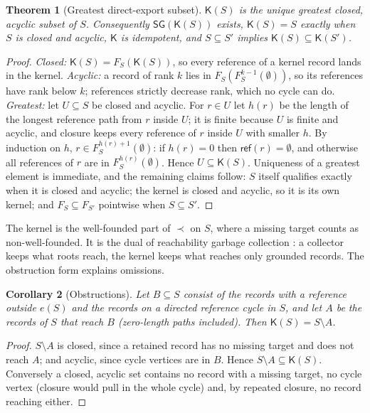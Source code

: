 \documentclass[11pt]{article}
\theoremstyle{plain}
\newtheorem{theorem}{Theorem}
\newtheorem{corollary}[theorem]{Corollary}
\theoremstyle{definition}
\theoremstyle{remark}
\newcommand{\SG}{\mathsf{SG}}
\newcommand{\refs}{\prec}
\newcommand{\Kernel}{\mathsf{K}}
\newcommand{\refset}{\mathsf{ref}}
\begin{document}
\begin{theorem}[Greatest direct-export subset]\label{thm:kernel}
$\Kernel(S)$ is the unique greatest closed, acyclic subset of $S$. Consequently
$\SG(\Kernel(S))$ exists, $\Kernel(S)=S$ exactly when $S$ is closed and acyclic,
$\Kernel$ is idempotent, and $S\subseteq S'$ implies $\Kernel(S)\subseteq\Kernel(S')$.
\end{theorem}
\begin{proof}
\emph{Closed:} $\Kernel(S)=F_S(\Kernel(S))$, so every reference of a kernel record
lands in the kernel. \emph{Acyclic:} a record of rank $k$ lies in
$F_S(F_S^{k-1}(\emptyset))$, so its references have rank below $k$; references
strictly decrease rank, which no cycle can do. \emph{Greatest:} let $U\subseteq S$
be closed and acyclic. For $r\in U$ let $h(r)$ be the length of the longest
reference path from $r$ inside $U$; it is finite because $U$ is finite and
acyclic, and closure keeps every reference of $r$ inside $U$ with smaller $h$. By
induction on $h$, $r\in F_S^{h(r)+1}(\emptyset)$: if $h(r)=0$ then
$\refset(r)=\emptyset$, and otherwise all references of $r$ are in
$F_S^{h(r)}(\emptyset)$. Hence $U\subseteq\Kernel(S)$. Uniqueness of a greatest
element is immediate, and the remaining claims follow: $S$ itself qualifies exactly
when it is closed and acyclic; the kernel is closed and acyclic, so it is its own
kernel; and $F_S\subseteq F_{S'}$ pointwise when $S\subseteq S'$.
\end{proof}

The kernel is the well-founded part of $\refs$ on $S$, where a missing target
counts as non-well-founded. It is the dual of reachability garbage collection
\cite{jones1996gc}: a collector keeps what roots reach, the kernel keeps what reaches
only grounded records. The obstruction form explains omissions.

\begin{corollary}[Obstructions]\label{cor:obstructions}
Let $B\subseteq S$ consist of the records with a reference outside $e(S)$ and the
records on a directed reference cycle in $S$, and let $A$ be the records of $S$ that
reach $B$ (zero-length paths included). Then $\Kernel(S)=S\setminus A$.
\end{corollary}
\begin{proof}
$S\setminus A$ is closed, since a retained record has no missing target and does
not reach $A$; and acyclic, since cycle vertices are in $B$. Hence
$S\setminus A\subseteq\Kernel(S)$. Conversely a closed, acyclic set contains no
record with a missing target, no cycle vertex (closure would pull in the whole
cycle) and, by repeated closure, no record reaching either.
\end{proof}
\end{document}
